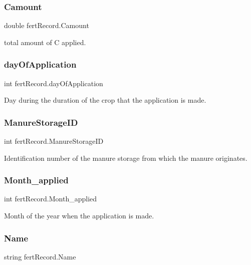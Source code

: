 \subsubsection{\texorpdfstring{Camount}{Camount}}
{\footnotesize\ttfamily double fert\+Record.\+Camount}

total amount of C applied. \mbox{\label{classfert_record_a999d28e9fac11717726d469ffefe0292}} 
\subsubsection{\texorpdfstring{dayOfApplication}{dayOfApplication}}
{\footnotesize\ttfamily int fert\+Record.\+day\+Of\+Application}

Day during the duration of the crop that the application is made. \mbox{\label{classfert_record_a91e455f4ce8924187f4351359f1c0be7}} 
\subsubsection{\texorpdfstring{ManureStorageID}{ManureStorageID}}
{\footnotesize\ttfamily int fert\+Record.\+Manure\+Storage\+ID}

Identification number of the manure storage from which the manure originates. \mbox{\label{classfert_record_aa387b8011b0ad697b1d8ab0ee821a425}} 
\subsubsection{\texorpdfstring{Month\_applied}{Month\_applied}}
{\footnotesize\ttfamily int fert\+Record.\+Month\+\_\+applied}

Month of the year when the application is made. \mbox{\label{classfert_record_a04116c39447ca7dba821361c530b23f9}} 
\subsubsection{\texorpdfstring{Name}{Name}}
{\footnotesize\ttfamily string fert\+Record.\+Name}

